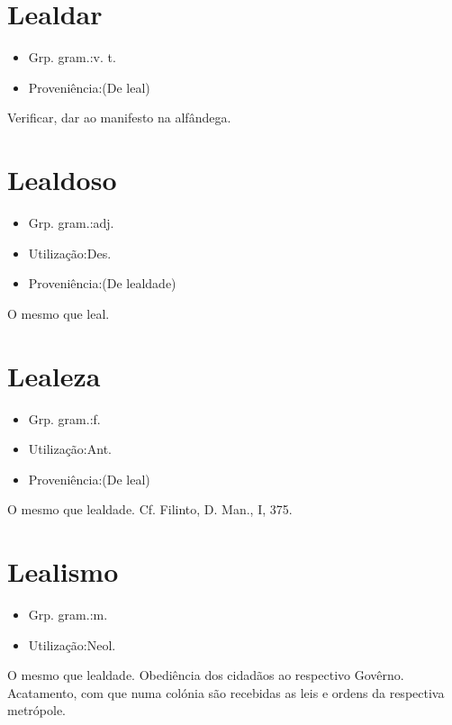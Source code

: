 \section{Lealdar}
\begin{itemize}
\item {Grp. gram.:v. t.}
\end{itemize}
\begin{itemize}
\item {Proveniência:(De \textunderscore leal\textunderscore )}
\end{itemize}
Verificar, dar ao manifesto na alfândega.
\section{Lealdoso}
\begin{itemize}
\item {Grp. gram.:adj.}
\end{itemize}
\begin{itemize}
\item {Utilização:Des.}
\end{itemize}
\begin{itemize}
\item {Proveniência:(De \textunderscore lealdade\textunderscore )}
\end{itemize}
O mesmo que \textunderscore leal\textunderscore .
\section{Lealeza}
\begin{itemize}
\item {Grp. gram.:f.}
\end{itemize}
\begin{itemize}
\item {Utilização:Ant.}
\end{itemize}
\begin{itemize}
\item {Proveniência:(De \textunderscore leal\textunderscore )}
\end{itemize}
O mesmo que \textunderscore lealdade\textunderscore . Cf. Filinto, \textunderscore D. Man.\textunderscore , I, 375.
\section{Lealismo}
\begin{itemize}
\item {Grp. gram.:m.}
\end{itemize}
\begin{itemize}
\item {Utilização:Neol.}
\end{itemize}
O mesmo que \textunderscore lealdade\textunderscore .
Obediência dos cidadãos ao respectivo Govêrno.
Acatamento, com que numa colónia são recebidas as leis e ordens da respectiva metrópole.
